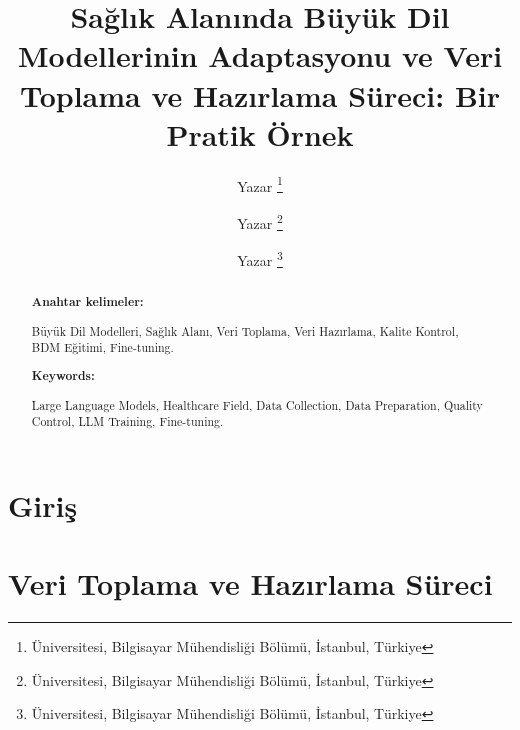 \documentclass[conference,a4paper,10pt]{article}
\newenvironment{anahtarkelimeler}{
    \textbf{Anahtar kelimeler:}
}{}
\newenvironment{keywords}{
    \textbf{Keywords:}
}{}
\begin{document}
\title{Sağlık Alanında Büyük Dil Modellerinin Adaptasyonu ve Veri Toplama ve Hazırlama Süreci: Bir Pratik Örnek}

\author{
    Yazar 
    \thanks{Üniversitesi, Bilgisayar Mühendisliği Bölümü, İstanbul, Türkiye }
    \and
    Yazar 
    \thanks{Üniversitesi, Bilgisayar Mühendisliği Bölümü, İstanbul, Türkiye }
    \and
    Yazar 
    \thanks{Üniversitesi, Bilgisayar Mühendisliği Bölümü, İstanbul, Türkiye }
}

\maketitle

\begin{multicols}{2}
\begin{abstract}
    
    \begin{anahtarkelimeler}
        Büyük Dil Modelleri, Sağlık Alanı, Veri Toplama, Veri Hazırlama, Kalite Kontrol, BDM Eğitimi, Fine-tuning.
    \end{anahtarkelimeler}
\end{abstract}

\hspace{0.15in}


\begin{abstract}
    
    
    \begin{keywords}
        Large Language Models, Healthcare Field, Data Collection, Data Preparation, Quality Control, LLM Training, Fine-tuning.
    \end{keywords}  
\end{abstract}

\section{Giriş}


\section{Veri Toplama ve Hazırlama Süreci}


\begin{multicols}{2}

\end{multicols}
\end{multicols}
\end{document}
